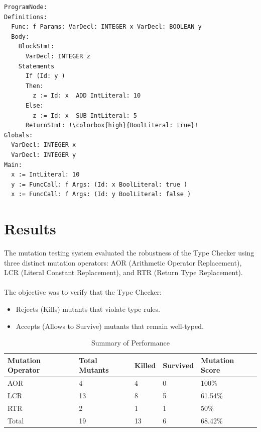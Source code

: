 \documentclass[titlepage]{article}
\begin{document}
\begin{lstlisting}[escapechar=!, caption={RTR Mutated AST (Killed)}, label={lst:rtr_mut_ast}]
ProgramNode:
Definitions: 
  Func: f Params: VarDecl: INTEGER x VarDecl: BOOLEAN y 
  Body:
    BlockStmt:
      VarDecl: INTEGER z 
    Statements
      If (Id: y )
      Then:
        z := Id: x  ADD IntLiteral: 10 
      Else:
        z := Id: x  SUB IntLiteral: 5 
      ReturnStmt: !\colorbox{high}{BoolLiteral: true}! 
Globals: 
  VarDecl: INTEGER x 
  VarDecl: INTEGER y 
Main: 
  x := IntLiteral: 10 
  y := FuncCall: f Args: (Id: x BoolLiteral: true )
  x := FuncCall: f Args: (Id: y BoolLiteral: false )
\end{lstlisting}

\newpage

\section{Results}

The mutation testing system evaluated the robustness of the Type Checker using three distinct mutation operators: AOR (Arithmetic Operator Replacement), LCR (Literal Constant Replacement), and RTR (Return Type Replacement). \\ \\
The objective was to verify that the Type Checker:
\begin{itemize}[noitemsep]
    \item Rejects (Kills) mutants that violate type rules.
    \item Accepts (Allows to Survive) mutants that remain well-typed.
\end{itemize}

\begin{table}[h]
\centering
\caption{Summary of Performance}
\label{tab:perf_summary}

\begin{tabular}{|l|l|l|l|l|}
\hline
Mutation Operator & Total Mutants & Killed & Survived & Mutation Score \\ \hline
AOR               & 4             & 4      & 0        & 100\%          \\
LCR               & 13            & 8      & 5        & 61.54\%        \\
RTR               & 2             & 1      & 1        & 50\%           \\ \hline
Total             & 19            & 13     & 6        & 68.42\%        \\ \hline
\end{tabular}
\end{table}
\end{document}
